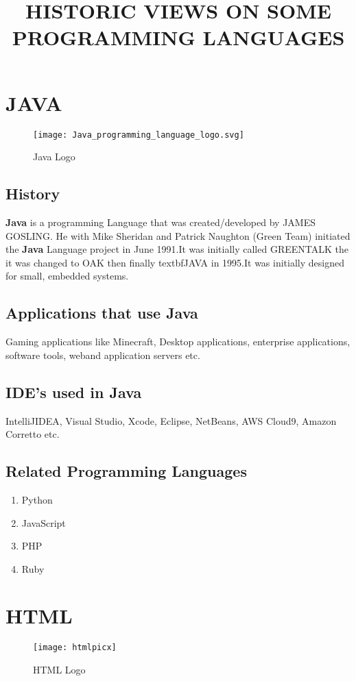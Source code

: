\documentclass{article}
\begin{document}
	\title{HISTORIC VIEWS ON SOME PROGRAMMING LANGUAGES}
       \section{JAVA}	
       \centering
\begin{figure}[t]
	\texttt{[image: Java\_programming\_language\_logo.svg]}
	\caption{Java Logo}
	\label{Java Logo}
\end{figure}
            \subsection{History}
            \textbf{Java} is a programming Language that was created/developed by JAMES GOSLING. He with Mike Sheridan and Patrick Naughton (Green Team) initiated the \textbf{Java} Language project in June 1991.It was initially called GREENTALK the it was changed to OAK then finally textbf{JAVA} in 1995.It was initially designed for small, embedded systems.
            \subsection{Applications that use Java}
            Gaming applications like Minecraft, Desktop applications, enterprise applications, software tools, weband application servers etc.
            \subsection{IDE's used in Java}
            IntelliJIDEA, Visual Studio, Xcode, Eclipse, NetBeans, AWS Cloud9, Amazon Corretto etc.
            \subsection{Related Programming Languages}
            \begin{enumerate}
                \item Python
                \item JavaScript
                \item PHP
                \item Ruby
             \end{enumerate}   
         \pagebreak
         \section{HTML}
\begin{figure}[t]
	\centering
	\texttt{[image: htmlpicx]}
	\caption{HTML Logo}
	\label{Html Logo}
\end{figure}
\end{document}
